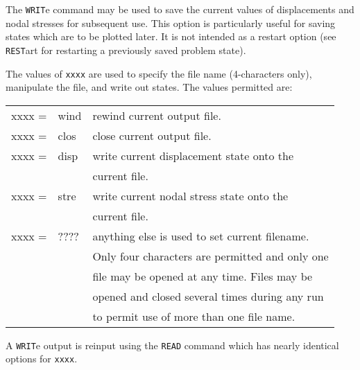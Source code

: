 \headb

The {\tt WRIT}e command may be used to save the
current values of displacements and nodal stresses for subsequent use.
This option is particularly useful for saving
states which are to be plotted later.  It is not intended as
a restart option (see {\tt REST}art for restarting a previously
saved problem state).

The values of {\tt xxxx} are used to specify the file  name
(4-characters  only),  manipulate  the  file,  and write out
states.  The values permitted are:

\begin{center}
\begin{tabular}{l l l}
 xxxx =& wind & rewind current output file. \\
 xxxx =& clos & close current output file. \\
 xxxx =& disp & write current displacement state onto the \\
       &      & current file. \\
 xxxx =& stre & write current nodal stress state onto the \\
       &      & current file. \\
 xxxx =& ???? & anything else is used to set current filename. \\
       &      & Only four characters are permitted and only one \\
       &      & file may be opened at any time.  Files may be \\
       &      & opened and closed several times during any run \\
       &      & to permit use of more than one file name.
\end{tabular}
\end{center}

A {\tt WRIT}e output is reinput using the {\tt READ} command
which has nearly identical options for {\tt xxxx}.
\vfill\eject
